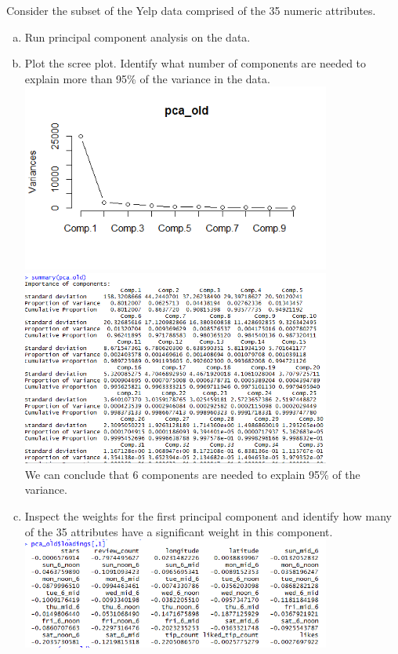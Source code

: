 \documentclass[11pt]{article}
\begin{document}
Consider the subset of the Yelp data comprised of the 35 numeric attributes.
\begin{enumerate}[(a)]
\item Run principal component analysis on the data. 
\item Plot the scree plot. Identify what number of components are needed to explain more than 95\% of the variance in the data. \\
\includegraphics[width=4in]{pca_old.png}\\ 
\includegraphics[width=4in]{pca_old_result.png}\\
We can conclude that 6 components are needed to explain 95\% of the variance.
\item Inspect the weights for the first principal component and identify how many of the 35 attributes have a significant weight in this component. \\
\includegraphics[width=4in]{a.png}\\

\end{enumerate}
\end{document}
